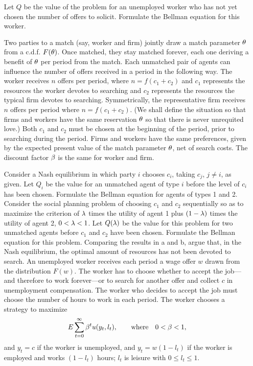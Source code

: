 Let $Q$ be the value of the problem for an unemployed worker
who has not yet chosen the number of offers to solicit.  Formulate
the Bellman equation for this worker.

\medskip
{}
\medskip
\noindent Two parties to a match (say, worker and firm) jointly draw a match parameter
${\theta}$ from a c.d.f. $F({\theta})$.  Once matched, they stay matched forever, each
one deriving a benefit of ${\theta}$ per period from the match.  Each unmatched
pair of agents can influence the number of offers received in a period in the
following way.   The worker receives $n$ offers per period, where
$n=f(c_1+c_2)$ and $c_1$ represents
the resources the worker devotes to searching
and $c_2$ represents the resources the typical firm  devotes to searching.
Symmetrically, the representative firm receives $n$ offers per period where
$n=f(c_1+c_2)$.  (We shall define the situation so that firms and workers have
the same reservation ${\theta}$ so that there is never unrequited love.)  Both $c_1$
and $c_2$ must be chosen at the beginning of the period, prior to searching
during the period.  Firms and workers have the same preferences, given by the
expected present value of the match parameter ${\theta}$, net of search costs.  The
discount factor ${\beta}$ is the same for worker and firm.

\medskip{}
  Consider a Nash equilibrium in which party $i$ chooses $c_i$, taking
$c_j$, $j\not=i$, as given.  Let $Q_i$ be the value for an unmatched agent of
type $i$ before the level of $c_i$ has been chosen.  Formulate the Bellman
equation for agents of types 1 and 2.
\medskip{} Consider the social planning problem of choosing $c_1$ and $c_2$
sequentially so as to maximize the criterion of $\lambda$ times the utility of
agent 1 plus $(1-\lambda)$ times the utility of agent 2, $0<\lambda <1$.  Let $Q(\lambda)$
be the value for this problem for two unmatched agents before $c_1$ and $c_2$
have been chosen.  Formulate the Bellman equation for this problem.
\medskip{} Comparing the results in a and b, argue that, in the Nash
equilibrium, the optimal amount of resources has not been devoted to search.
\medskip
{}
\medskip
\noindent An unemployed worker receives each period a wage offer $w$ drawn from the
distribution $F(w)$.  The worker has to choose whether to accept the job---and
therefore to work forever---or to search for another offer and collect $c$ in
unemployment compensation.  The worker who decides to accept the job must
choose the number of hours to work in each period.  The worker chooses a
strategy to maximize
$$E\sum_{t=0}^\infty {\beta}^t u(y_t,l_t),\qquad {\rm where}\quad 0<{\beta}<1,$$
and $y_t=c$ if the worker is unemployed, and $y_t=w(1-l_t)$ if the worker is
employed and works $(1-l_t)$ hours; $l_t$ is leisure with $0\le l_t\le 1$.

